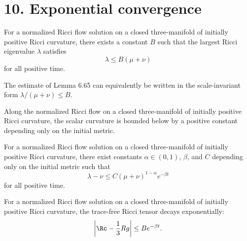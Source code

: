 \section*{10. Exponential convergence}

\begin{lemma}
\label{ch06-lem-pinching-ricci-eigenvalues}

For a normalized Ricci flow solution on a closed three-manifold of initially positive Ricci curvature, there exists a constant \(B\) such that the largest Ricci eigenvalue \(\lambda\) satisfies
\[
\lambda\le B(\mu+\nu)
\]
for all positive time.
\end{lemma}

\begin{remark}
\label{ch06-rem-scale-invariant-pinching}

The estimate of Lemma 6.65 can equivalently be written in the scale-invariant form \(\lambda/(\mu+\nu)\le B\).
\end{remark}

\begin{lemma}
\label{ch06-lem-uniform-positive-scalar-lower-bound}

Along the normalized Ricci flow on a closed three-manifold of initially positive Ricci curvature, the scalar curvature is bounded below by a positive constant depending only on the initial metric.
\end{lemma}

\begin{proposition}
\label{ch06-prop-exponential-pinching-sectional-curvature}

For a normalized Ricci flow solution on a closed three-manifold of initially positive Ricci curvature, there exist constants \(\alpha\in(0,1)\), \(\beta\), and \(C\) depending only on the initial metric such that
\[
\lambda-\nu\le C(\mu+\nu)^{1-\alpha}e^{-\beta t}
\]
for all positive time.
\end{proposition}

\begin{corollary}
\label{ch06-cor-exponential-decay-tracefree-ricci}

For a normalized Ricci flow solution on a closed three-manifold of initially positive Ricci curvature, the trace-free Ricci tensor decays exponentially:
\[
\left|\Rc-\frac13 Rg\right| \le Be^{-\beta t}.
\]
\end{corollary}
